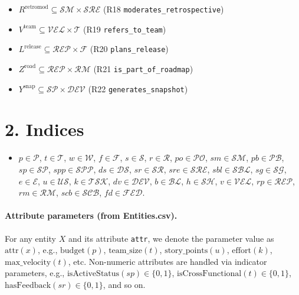 \documentclass[11pt,a4paper]{article}
\begin{document}
\begin{itemize}[leftmargin=2em]
\begin{itemize}
     \item $R^{\mathrm{retromod}} \subseteq \mathcal{SM}\times\mathcal{SRE}$ (R18 \texttt{moderates\_retrospective})
     \item $V^{\mathrm{team}} \subseteq \mathcal{VEL}\times\mathcal{T}$ (R19 \texttt{refers\_to\_team})
     \item $L^{\mathrm{release}} \subseteq \mathcal{REP}\times\mathcal{F}$ (R20 \texttt{plans\_release})
     \item $Z^{\mathrm{road}} \subseteq \mathcal{REP}\times\mathcal{RM}$ (R21 \texttt{is\_part\_of\_roadmap})
     \item $Y^{\mathrm{snap}} \subseteq \mathcal{SP}\times\mathcal{DEV}$ (R22 \texttt{generates\_snapshot})
  \end{itemize}
\end{itemize}

\section{2. Indices}
\begin{itemize}[leftmargin=2em]
  \item $p\in\mathcal{P}$, $t\in\mathcal{T}$, $w\in\mathcal{W}$, $f\in\mathcal{F}$, $s\in\mathcal{S}$, $r\in\mathcal{R}$, $po\in\mathcal{PO}$, $sm\in\mathcal{SM}$,
  $pb\in\mathcal{PB}$, $sp\in\mathcal{SP}$, $spp\in\mathcal{SPP}$, $ds\in\mathcal{DS}$, $sr\in\mathcal{SR}$, $sre\in\mathcal{SRE}$,
  $sbl\in\mathcal{SBL}$, $sg\in\mathcal{SG}$, $e\in\mathcal{E}$, $u\in\mathcal{US}$, $k\in\mathcal{TSK}$, $dv\in\mathcal{DEV}$, $b\in\mathcal{BL}$,
  $h\in\mathcal{SH}$, $v\in\mathcal{VEL}$, $rp\in\mathcal{REP}$, $rm\in\mathcal{RM}$, $scb\in\mathcal{SCB}$, $fd\in\mathcal{FED}$.
\end{itemize}

\paragraph{Attribute parameters (from Entities.csv).}
For any entity $X$ and its attribute \texttt{attr}, we denote the parameter value as $\mathrm{attr}(x)$, e.g., $\mathrm{budget}(p)$, $\mathrm{team\_size}(t)$, $\mathrm{story\_points}(u)$, $\mathrm{effort}(k)$, $\mathrm{max\_velocity}(t)$, etc. Non-numeric attributes are handled via indicator parameters, e.g., $\mathrm{isActiveStatus}(sp)\in\{0,1\}$, $\mathrm{isCrossFunctional}(t)\in\{0,1\}$, $\mathrm{hasFeedback}(sr)\in\{0,1\}$, and so on.
\end{document}
